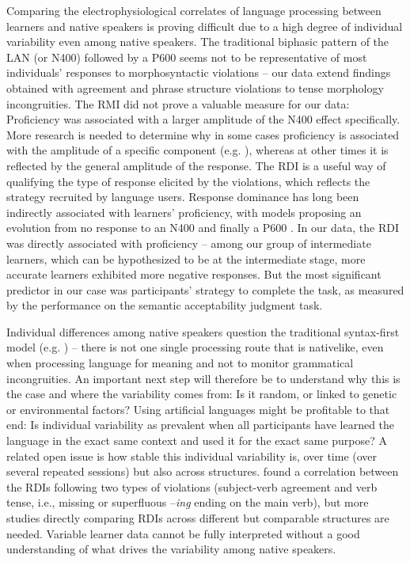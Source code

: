 \documentclass[output=paper,colorlinks,citecolor=brown,modfonts,nonflat]{../langscibook}
\begin{document}
Comparing the electrophysiological correlates of language processing between learners and native speakers is proving difficult due to a high degree of individual variability even among native speakers. The traditional biphasic pattern of the LAN (or N400) followed by a P600 seems not to be representative of most individuals’ responses to morphosyntactic violations – our data extend findings obtained with agreement and phrase structure violations to tense morphology incongruities. The RMI did not prove a valuable measure for our data: Proficiency was associated with a larger amplitude of the N400 effect specifically. More research is needed to determine why in some cases proficiency is associated with the amplitude of a specific component (e.g. \citealt{TannerEtAl2009,TannerEtAl2013,WhiteEtAl2012}), whereas at other times it is reflected by the general amplitude of the response. The RDI is a useful way of qualifying the type of response elicited by the violations, which reflects the strategy recruited by language users. Response dominance has long been indirectly associated with learners’ proficiency, with models proposing an evolution from no response to an N400 and finally a P600 \citep{SteinhauerEtAl2009}. In our data, the RDI was directly associated with proficiency – among our group of intermediate learners, which can be hypothesized to be at the intermediate stage, more accurate learners exhibited more negative responses. But the most significant predictor in our case was participants’ strategy to complete the task, as measured by the performance on the semantic acceptability judgment task.

Individual differences among native speakers question the traditional syntax-first model (e.g. \citealt{Friederici2002}) – there is not one single processing route that is nativelike, even when processing language for meaning and not to monitor grammatical incongruities. An important next step will therefore be to understand why this is the case and where the variability comes from: Is it random, or linked to genetic or environmental factors? Using artificial languages might be profitable to that end: Is individual variability as prevalent when all participants have learned the language in the exact same context and used it for the exact same purpose?  A related open issue is how stable this individual variability is, over time (over several repeated sessions) but also across structures. \citet{TannerHell2014} found a correlation between the RDIs following two types of violations (subject-verb agreement and verb tense, i.e., missing or superfluous –\textit{ing} ending on the main verb), but more studies directly comparing RDIs across different but comparable structures are needed. Variable learner data cannot be fully interpreted without a good understanding of what drives the variability among native speakers.
\end{document}
